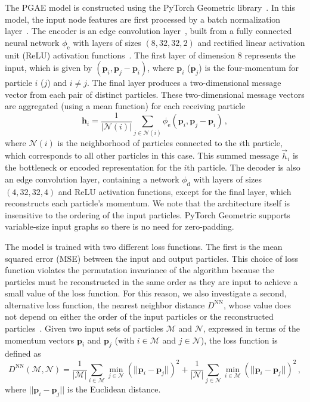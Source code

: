 \documentclass[letterpaper,11pt]{article}
\begin{document}
The PGAE model is constructed using the PyTorch Geometric library~\cite{PyTorchGeometric}.
In this model, the input node features are first processed by a batch normalization layer~\cite{batchnorm}.
The encoder is an edge convolution layer~\cite{DGCNN}, built from a fully connected neural network $\phi_\mathrm{e}$ with layers of sizes $(8, 32, 32, 2)$ and rectified linear activation unit (ReLU) activation functions~\cite{relu}.
The first layer of dimension $8$ represents the input, which is given by $(\boldsymbol{p}_i, \boldsymbol{p}_j-\boldsymbol{p}_i)$, where $\boldsymbol{p}_i$ ($\boldsymbol{p}_j$) is the four-momentum for particle $i$ ($j$) and $i\neq j$.
The final layer produces a two-dimensional message vector from each pair of distinct particles.
These two-dimensional message vectors are aggregated (using a mean function) for each receiving particle
\begin{equation}
\boldsymbol{h}_i = \frac{1}{|\mathcal N(i)|}\sum_{j\in \mathcal N(i)} \phi_\mathrm{e}(\boldsymbol{p}_i, \boldsymbol{p}_j-\boldsymbol{p}_i)\,,
\end{equation}
where $\mathcal N(i)$ is the neighborhood of particles connected to the $i$th particle, which corresponds to all other particles in this case.
This summed message $\vec h_i$ is the bottleneck or encoded representation for the $i$th particle.
The decoder is also an edge convolution layer, containing a network $\phi_\mathrm{d}$ with layers of sizes $(4, 32, 32, 4)$ and ReLU activation functions, except for the final layer, which reconstructs each particle's momentum.
We note that the architecture itself is insensitive to the ordering of the input particles. 
PyTorch Geometric supports variable-size input graphs so there is no need for zero-padding.

The model is trained with two different loss functions. 
The first is the mean squared error (MSE) between the input and output particles. 
This choice of loss function violates the permutation invariance of the algorithm because the particles must be reconstructed in the same order as they are input to achieve a small value of the loss function.
For this reason, we also investigate a second, alternative loss function, the nearest neighbor distance $D^\mathrm{NN}$, whose value does not depend on either the order of the input particles or the reconstructed particles~\cite{sparsegen_vae}.
Given two input sets of particles $\mathcal{M}$ and $\mathcal{N}$, expressed in terms of the momentum vectors $\boldsymbol{p}_i$ and $\boldsymbol{p}_j$ (with $i \in \mathcal{M}$ and $j \in \mathcal{N}$), the loss function is defined as
\begin{equation}
D^\mathrm{NN}(\mathcal{M}, \mathcal{N}) =  \frac{1}{|\mathcal{M}|}\sum_{i \in \mathcal{M}} \min_{j \in \mathcal{N}} \left(||\boldsymbol{p}_i - \boldsymbol{p}_j||\right)^2 + \frac{1}{|\mathcal{N}|}\sum_{j \in \mathcal{N}} \min_{i \in \mathcal{M}} \left(||\boldsymbol{p}_i - \boldsymbol{p}_j||\right)^2\,,
\label{eq:L_NND}
\end{equation}
where $||\boldsymbol{p}_i-\boldsymbol{p}_j||$ is the Euclidean distance.
\end{document}
